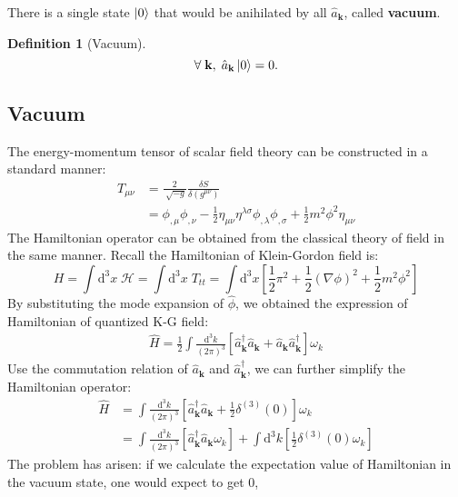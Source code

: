 \documentclass[12pt]{article}
\numberwithin{equation}{section}
\theoremstyle{1style}
\newtheorem{definition}[equation]{Definition}
\newcommand{\tbf}[1]{\textbf{#1}}
\newcommand{\id}{\mathrm{d}}
\begin{document}
There is a single state \(\ket{0}\) that would be anihilated by all \(\hat{a}_{\mathbf{k}}\), called \tbf{vacuum}.
\begin{definition}[Vacuum]
  \[\forall\; \mathbf{k},\; \hat{a}_{\mathbf{k}}\ket{0}=0.\]
\end{definition}



\subsection{Vacuum}

The energy-momentum tensor of scalar field theory can be constructed in a standard manner:
\begin{align}
  T_{\mu\nu} & =\frac{2}{\sqrt[]{-g}}\frac{\delta S}{\delta(g^{\mu\nu})}                                         \\
             & =\phi_{,\mu}\phi_{,\nu}-\frac{1}{2}\eta_{\mu\nu}\eta^{\lambda\sigma}\phi_{,\lambda}\phi_{,\sigma}
  +\frac{1}{2}m^2\phi^2\eta_{\mu\nu}
\end{align}
The Hamiltonian operator can be obtained from the classical theory of field in the same manner.
Recall the Hamiltonian of Klein-Gordon field is:
\begin{equation}
  H=\int\id^3x\;\mathcal{H}=\int\id^3x\;T_{tt}=\int\id^3x\left[\frac{1}{2}\pi^2+\frac{1}{2}(\nabla\phi)^2+\frac{1}{2}m^2\phi^2\right]
\end{equation}
By substituting the mode expansion of \(\hat{\phi}\), we obtained the expression of Hamiltonian of quantized K-G field:
\begin{align}
  \hat{H}=\frac{1}{2}\int \frac{\id^{3}k}{(2\pi)^3}\left[\hat{a}^{\dagger}_{\mathbf{k}}\hat{a}_{\mathbf{k}}+\hat{a}_{\mathbf{k}}\hat{a}^{\dagger}_{\mathbf{k}}\right]\omega_{k}
\end{align}
Use the commutation relation of \(\hat{a}_{\mathbf{k}}\) and \(\hat{a}^{\dagger}_{\mathbf{k}}\), we can further simplify the Hamiltonian operator:
\begin{align}\label{134}
  \hat{H} & =\int \frac{\id^{3}k}{(2\pi)^3}\left[\hat{a}^{\dagger}_{\mathbf{k}}\hat{a}_{\mathbf{k}}+\frac{1}{2}\delta^{(3)}(0)\right]\omega_{k} \\
          & =\int \frac{\id^{3}k}{(2\pi)^3}\left[\hat{a}^{\dagger}_{\mathbf{k}}\hat{a}_{\mathbf{k}}\omega_{k}\right]+
  \int \id^{3}k\left[\frac{1}{2}\delta^{(3)}(0)\omega_{k}\right]
\end{align}
The problem has arisen: if we calculate the expectation value of Hamiltonian in the vacuum state, one would expect to get 0,
\end{document}
